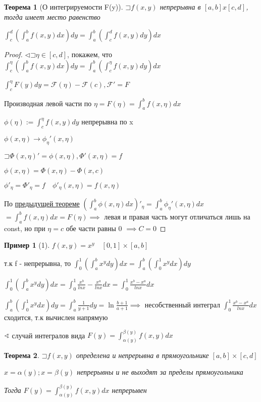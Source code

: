 \documentclass[a4paper, 12pt]{article}
\newcommand\letsymbol{\mathord{\sqsupset}}
\newtheorem{theorem}{Теорема}[section]
\theoremstyle{definition}
\newtheorem*{example}{Пример}
\theoremstyle{remark}
\begin{document}
\begin{theorem}[О интегрируемости F(y)] 
     $\letsymbol{}f(x,y)$ непрерывна в $[a, b]x[c, d]$, тогда имеет место равенство

     $\int_c^d (\int_a^b f(x,y)dx)dy = \int_a^b (\int_c^d f(x,y)dy)dx$
\end{theorem}
\begin{proof}
     $\triangleleft \letsymbol{} \eta \in [c, d]$, покажем, что
$\int_c^\eta (\int_a^b f(x,y)dx)dy = \int_a^b (\int_c^\eta f(x,y)dy)dx$

$\int_c^\eta F(y)dy = \mathcal{F}(\eta) -  \mathcal{F}(c), \mathcal{F}' = F$

Производная левой части по $\eta = F(\eta) = \int_a^b f(x,\eta)dx$

$\phi (\eta) := \int_c^\eta f(x,y)dy$ непрерывна по x

$\phi (x, \eta) \rightarrow \phi_\eta'(x, \eta)$

$\letsymbol{} \Phi(x, \eta)'= \phi(x,\eta), \Phi'(x,\eta) = f$

$\phi(x,\eta) = \Phi(x,\eta) - \Phi(x, c)$

$\phi'_\eta = \Phi'_\eta  = f \quad \phi'_\eta(x, \eta) = f(x, \eta)$

По \hyperlink{theorem4}{предыдущей теореме}
$(\int_a^{b}\phi(x, \eta)dx)'_\eta = \int_a^b \phi_\eta'(x, \eta)dx$
$= \int_a^b f(x,\eta)dx = F(\eta)\implies$
левая и правая часть могут отличаться лишь на const, но при $\eta = c$
обе части равны 0 $\implies C = 0$
\end{proof}


\begin{example}[1]
     $f(x,y) = x^y\quad [0, 1]\times[a, b]$
     
     т.к f -  непрерывна, то $\int_0^1(\int_a^b x^y dy)dx = \int_a^b(\int_0^1x^ydx)dy$
     
     $\int_0^1(\int_a^b x^y dy)dx = \int_0^1 \frac{x^b}{lnx} - \frac{x^a}{lnx}dx = \int_0^1 \frac{x^b-x^a}{lnx}dx$

     $\int_a^b(\int_0^1x^ydx)dy = \int_a^b \frac{1}{y+1}dy = \ln {\frac{b+1}{a+1}}\implies $ несобственный интеграл $\int_0^1 \frac{x^b-x^a}{lnx}dx$ сходится, т.к вычислен напрямую
\end{example}
$\sphericalangle $ случай интегралов вида $F(y) = \int_{\alpha(y)}^{\beta(y)}f(x,y)dx$

\begin{theorem}
     $\letsymbol{} f(x,y)$ определена и непрерывна в прямоугольнике $[a, b]\times[c, d]$

     $x = \alpha(y); x = \beta(y)$ непрерывны и не выходят за пределы прямоугольника

     Тогда $F(y) = \int_{\alpha(y)}^{\beta(y)}f(x,y)dx$ непрерывен
\end{theorem}
\end{document}
